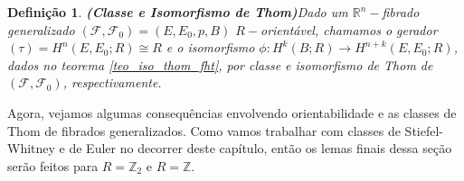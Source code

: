 \documentclass[12pt,oneside]{book} %
\newtheorem{defi}   {\hspace{0.5cm}Defini\c c\~ao}[chapter]
\newtheorem{lem}    {\hspace{0.5cm}Lema}[chapter]
\newcommand{\R}{\mathbb{R}}
\newcommand{\Z}{\mathbb{Z}}
\begin{document}
\begin{defi}{\bf (Classe e Isomorfismo de Thom)}\label{defi_thom}
	Dado um $\R^{n}-$fibrado generalizado $(\mathcal{F},\mathcal{F}_{0})=(E,E_{0},p,B)$ $R-$orientável, chamamos o gerador $(\tau)=H^{n}(E,E_{0};R)\cong R$ e o isomorfismo $\phi:H^{k}(B;R)\to H^{n+k}(E,E_{0};R)$, dados no teorema \ref{teo_iso_thom_fht}, por classe e isomorfismo de Thom de $(\mathcal{F},\mathcal{F}_{0})$, respectivamente.
\end{defi}

\par Agora, vejamos algumas consequências envolvendo orientabilidade e as classes de Thom de fibrados generalizados. Como vamos trabalhar com classes de Stiefel-Whitney e de Euler no decorrer deste capítulo, então os lemas finais dessa seção serão feitos para $R=\Z_{2}$ e $R=\Z$.

%
%
%
\end{document}
